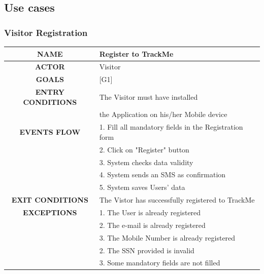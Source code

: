 \documentclass[12pt,a4paper]{article}
\begin{document}
	\newpage
	\subsection{Use cases}
	\subsubsection{Visitor Registration }
	\begin{center}
		\begin{tabular}{| c | l |}
			\hline
			\textbf{NAME} & Register to TrackMe \\
			\hline
			\textbf{ACTOR} & Visitor \\
			\hline
			\textbf{GOALS} & [G1] \\
			\hline
			\textbf{ENTRY CONDITIONS} & The Visitor must have installed \\
			&	the Application on his/her Mobile device \\ \hline
			\textbf{EVENTS FLOW}  &
			1. Fill all mandatory fields in the Registration form\\
			&2. Click on "Register" button\\
			&3. System checks data validity\\
			&4. System sends an SMS as confirmation\\
			&5. System saves Users' data\\
			\hline
			\textbf{EXIT CONDITIONS}  & The Vistor has successfully registered to TrackMe\\ \hline
			\textbf{EXCEPTIONS} & 
			1. The User is already registered\\
			&2. The e-mail is already registered\\
			&3. The Mobile Number is already registered\\
			&2. The SSN provided is invalid\\
			&3. Some mandatory fields are not filled\\
			\hline
		\end{tabular}
	\end{center}
\end{document}

